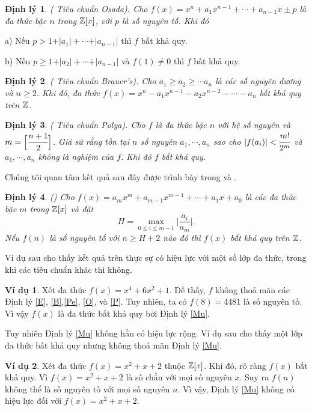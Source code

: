 \documentclass[a5paper,12pt]{report}
\theoremstyle{definition}
\newtheorem{vidu}{Ví dụ}[section]
\newtheorem{dinhly}{Định lý}[section]
\newcommand{\vd}{\begin{vidu}}
\newcommand{\hvd}{\end{vidu}}
\newcommand{\dl}{\begin{dinhly}\itshape}
\newcommand{\hdl}{\end{dinhly}}
\def\leq{\leqslant}
\def\geq{\geqslant}
\numberwithin{equation}{chapter}
\begin{document}
	
	
	\dl \label{O}  ( Tiêu chuẩn Osada). Cho  $f(x)=x^n+a_{1}x^{n-1}+\cdots +a_{n-1}x\pm p$ là đa thức bậc $n$ trong $\Bbb Z[x]$, với $p$ là số nguyên tố. Khi đó
	\par
	a) Nếu $ p>1+\vert a_1\vert+\cdots+\vert a_{n-1}\vert$  thì $f$ bất khả quy.\par
	b) Nếu  $p\geq 1+\vert a_2\vert+\cdots+\vert a_{n-1}\vert$  và $f(1)\ne 0$  thì $f$ bất khả quy.
	\hdl
	\dl  \label{B}  ( Tiêu chuẩn Brauer’s).
	Cho  $a_1 \geq a_2 \geq \cdots a_n$  là các số nguyên dương và
	$n\geq 2$. Khi đó, đa thức  $f(x)=x^n-a_1x^{n-1}-a_2x^{n-2}-\cdots-a_n$ bất khả quy trên $\Bbb Z$.
	\hdl
	
	\dl \label{P}  ( Tiêu chuẩn Polya).
	Cho $f$ là đa thức bậc $n$ với hệ số nguyên và $m = \Big[\cfrac{n+1}{2}\Big]$.  Giả sử rằng tồn tại $n$ số nguyên $a_1,\cdots,a_n$ sao cho $\vert f(a_i)\vert< \cfrac{m!}{2^m}$ và $a_1, \cdots,a_n$ không là nghiệm của $f$. Khi đó $f$ bất khả quy.
	\hdl
	
	Chúng tôi quan tâm kết quả sau đây được trình bày trong \cite{R} và \cite{BFO}.
	
	\dl \label{Mu} {\rm (\cite{R})} Cho $f(x)=a_mx^m+a_{m-1}x^{m-1}+\cdots+a_1x+a_0$ là các đa thức bậc $m$ trong $\Bbb Z[x]$ và đặt
	$$H = \max_{0\leq i\leq m-1}\Big\vert \frac{a_i}{a_m} \Big\vert.$$
	Nếu $f(n)$ là số nguyên tố với $n\geq H+2$ nào đó thì $f(x)$ bất khả quy trên $\Bbb Z$.
	\hdl
	Ví dụ sau cho thấy kết quả  trên thực sự có hiệu lực với một số lớp đa thức, trong khi các tiêu chuẩn khác thì không.
	\vd Xét đa thức $f(x)=x^4+6x^2+1$. Dễ thấy, $f$ không thoả mãn các Định lý \ref{E}, \ref{B},\ref{Pe}, \ref{O}, và \ref{P}. Tuy nhiên, ta có $f(8) = 4481$ là số nguyên tố. Vì vậy $f(x)$ là đa thức bất khả quy bởi Định lý \ref{Mu}.
	\hvd
	Tuy nhiên Định lý \ref{Mu} không hẳn có hiệu lực rộng. Ví dụ sau cho thấy một lớp đa thức bất khả quy nhưng không thoả mãn Định lý \ref{Mu}. 
	\vd Xét đa thức $f(x)=x^2+x+2$  thuộc  $\Bbb Z[x]$. Khi đó, rõ ràng $f(x)$ bất khả quy.  Vì
	$f(x)=x^2+x+2$
	là số chẳn với mọi số nguyên $x$. Suy ra $f(n)$ không thể là số nguyên tố với mọi số nguyên  $n$. Vì vậy, Định lý \ref{Mu} không có hiệu lực đối với $f(x)=x^2+x+2$.\hvd
	
\end{document}
